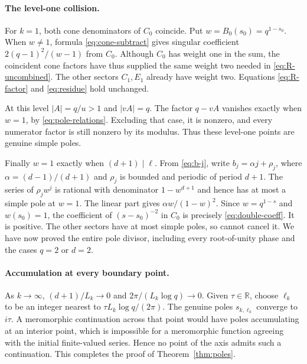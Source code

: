 \paragraph{The level-one collision.}
For $k=1$, both cone denominators of $C_0$ coincide.
Put $w=B_0(s_0)=q^{1-s_0}$. When $w\ne1$, formula
\eqref{eq:cone-subtract} gives singular coefficient
$2(q-1)^2/(w-1)$ from $C_0$. Although $C_0$ has weight
one in the sum, the coincident cone factors have thus supplied
the same weight two needed in \eqref{eq:R-uncombined}.
The other sectors $C_1,E_1$ already have weight two.
Equations \eqref{eq:R-factor} and \eqref{eq:residue} hold
unchanged.

At this level $|A|=q/u>1$ and $|vA|=q$. The factor
$q-vA$ vanishes exactly when $w=1$, by
\eqref{eq:pole-relations}. Excluding that case, it is nonzero,
and every numerator factor is still nonzero by its modulus.
Thus these level-one points are genuine simple poles.

Finally $w=1$ exactly when $(d+1)\mid\ell$. From
\eqref{eq:b-j}, write
$b_j=\alpha j+\rho_j$, where $\alpha=(d-1)/(d+1)$ and
$\rho_j$ is bounded and periodic of period $d+1$.
The series of $\rho_j w^j$ is rational with denominator
$1-w^{d+1}$ and hence has at most a simple pole at $w=1$.
The linear part gives $\alpha w/(1-w)^2$. Since
$w=q^{1-s}$ and $w(s_0)=1$, the coefficient of
$(s-s_0)^{-2}$ in $C_0$ is precisely
\eqref{eq:double-coeff}. It is positive. The other sectors
have at most simple poles, so cannot cancel it. We have now
proved the entire pole divisor, including every root-of-unity
phase and the cases $q=2$ or $d=2$.

\paragraph{Accumulation at every boundary point.}
As $k\to\infty$, $(d+1)/L_k\to0$ and
$2\pi/(L_k\log q)\to0$. Given $\tau\in\mathbb R$, choose
$\ell_k$ to be an integer nearest to
$\tau L_k\log q/(2\pi)$. The genuine poles $s_{k,\ell_k}$
converge to $i\tau$. A meromorphic continuation across that
point would have poles accumulating at an interior point,
which is impossible for a meromorphic function agreeing with
the initial finite-valued series. Hence no point of the axis
admits such a continuation. This completes the proof of
Theorem~\ref{thm:poles}.
